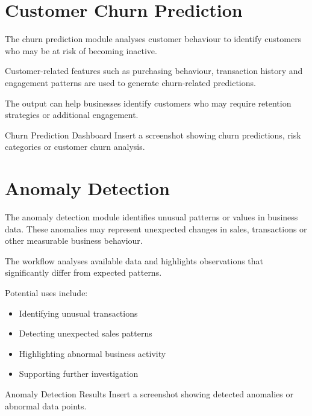 \documentclass[12pt,a4paper]{report}
\begin{document}

\section{Customer Churn Prediction}

The churn prediction module analyses customer behaviour to identify
customers who may be at risk of becoming inactive.

Customer-related features such as purchasing behaviour, transaction
history and engagement patterns are used to generate churn-related
predictions.

The output can help businesses identify customers who may require
retention strategies or additional engagement.

\begin{screenshotplaceholder}{Churn Prediction Dashboard}
Insert a screenshot showing churn predictions, risk categories or
customer churn analysis.
\end{screenshotplaceholder}


\section{Anomaly Detection}

The anomaly detection module identifies unusual patterns or values in
business data. These anomalies may represent unexpected changes in
sales, transactions or other measurable business behaviour.

The workflow analyses available data and highlights observations that
significantly differ from expected patterns.

Potential uses include:

\begin{itemize}
    \item Identifying unusual transactions
    \item Detecting unexpected sales patterns
    \item Highlighting abnormal business activity
    \item Supporting further investigation
\end{itemize}

\begin{screenshotplaceholder}{Anomaly Detection Results}
Insert a screenshot showing detected anomalies or abnormal data points.
\end{screenshotplaceholder}
\end{document}
